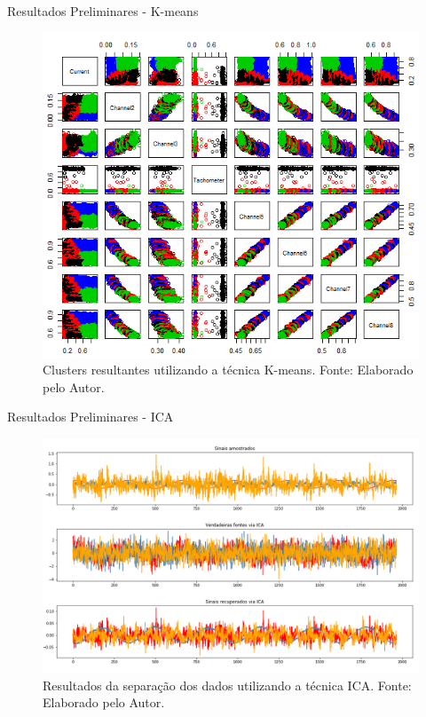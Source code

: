 \documentclass[aspectratio=169]{beamer}
\begin{document}
\begin{frame}{Resultados Preliminares - K-means}
	\begin{figure}[HT]
		\begin{center}
			\includegraphics[scale=.45]{../resultados/img/kmeans2.png}
			\caption{Clusters resultantes utilizando a técnica K-means. \newline
			Fonte: Elaborado pelo Autor.}
			\label{fig:kmeans2}
		\end{center}
	\end{figure}
\end{frame}


\begin{frame}{Resultados Preliminares - ICA}
	\begin{figure}[HT]
		\begin{center}
			\includegraphics[scale=.27]{../resultados/img/ica.png}
			\caption{Resultados da separação dos dados utilizando a técnica ICA. \newline
			Fonte: Elaborado pelo Autor.}
			\label{fig:ica}
		\end{center}
	\end{figure}
\end{frame}
\end{document}
